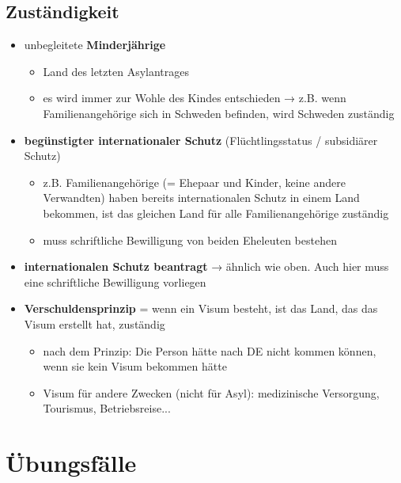 \documentclass[
]{article}
\providecommand{\tightlist}{%
  \setlength{\itemsep}{0pt}\setlength{\parskip}{0pt}}
\begin{document}
\hypertarget{zustuxe4ndigkeit}{%
\subsection{Zuständigkeit}\label{zustuxe4ndigkeit}}

\begin{itemize}
\tightlist
\item
  unbegleitete \textbf{Minderjährige}

  \begin{itemize}
  \tightlist
  \item
    Land des letzten Asylantrages
  \item
    es wird immer zur Wohle des Kindes entschieden → z.B. wenn
    Familienangehörige sich in Schweden befinden, wird Schweden
    zuständig
  \end{itemize}
\item
  \textbf{begünstigter internationaler Schutz} (Flüchtlingsstatus /
  subsidiärer Schutz)

  \begin{itemize}
  \tightlist
  \item
    z.B. Familienangehörige (= Ehepaar und Kinder, keine andere
    Verwandten) haben bereits internationalen Schutz in einem Land
    bekommen, ist das gleichen Land für alle Familienangehörige
    zuständig
  \item
    muss schriftliche Bewilligung von beiden Eheleuten bestehen
  \end{itemize}
\item
  \textbf{internationalen Schutz beantragt} → ähnlich wie oben. Auch
  hier muss eine schriftliche Bewilligung vorliegen
\item
  \textbf{Verschuldensprinzip} = wenn ein Visum besteht, ist das Land,
  das das Visum erstellt hat, zuständig

  \begin{itemize}
  \tightlist
  \item
    nach dem Prinzip: Die Person hätte nach DE nicht kommen können, wenn
    sie kein Visum bekommen hätte
  \item
    Visum für andere Zwecken (nicht für Asyl): medizinische Versorgung,
    Tourismus, Betriebsreise...
  \end{itemize}
\end{itemize}

\hypertarget{uxfcbungsfuxe4lle}{%
\section{Übungsfälle}\label{uxfcbungsfuxe4lle}}
\end{document}
